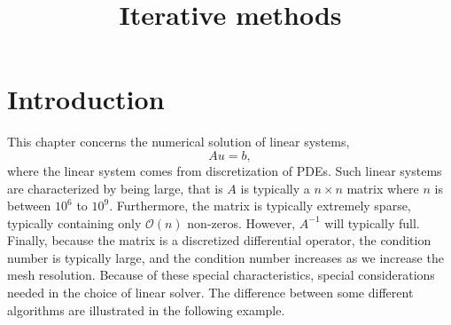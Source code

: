 \documentclass[a4paper,11pt]{amsart}
\title{Iterative methods}
\begin{document}


\section{Introduction}
This chapter concerns the numerical solution of linear systems,
\[
A u =  b,
\]
where the linear system comes from discretization of PDEs. Such
linear systems are characterized by being large, that
is $A$ is typically a $n\times n$ matrix where $n$ is
between $10^6$ to $10^9$. Furthermore, the matrix is typically
extremely sparse, typically containing only $\mathcal{O}(n)$ non-zeros.
However, $A^{-1}$ will typically full.
Finally, because the matrix is a discretized differential operator, the
condition number is typically large, and the condition number increases
as we increase the mesh resolution.  Because of these special characteristics,
special considerations needed in the choice of linear solver.
The difference between some different algorithms are illustrated in the following example.
\end{document}

